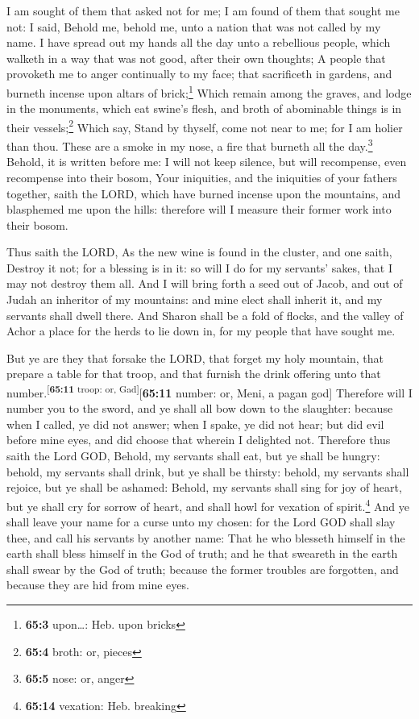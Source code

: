  I am sought of them that asked not for me; I am found of
them that sought me not: I said, Behold me, behold me, unto a nation
that was not called by my name.  I have spread out my
hands all the day unto a rebellious people, which walketh in a way that
was not good, after their own thoughts;  A people that
provoketh me to anger continually to my face; that sacrificeth in
gardens, and burneth incense upon altars of brick;\footnote{\textbf{65:3}
  upon\ldots: Heb. upon bricks}  Which remain among the
graves, and lodge in the monuments, which eat swine's flesh, and broth
of abominable things is in their vessels;\footnote{\textbf{65:4} broth:
  or, pieces}  Which say, Stand by thyself, come not near
to me; for I am holier than thou. These are a smoke in my nose, a fire
that burneth all the day.\footnote{\textbf{65:5} nose: or, anger}
 Behold, it is written before me: I will not keep silence,
but will recompense, even recompense into their bosom, 
Your iniquities, and the iniquities of your fathers together, saith the
LORD, which have burned incense upon the mountains, and blasphemed me
upon the hills: therefore will I measure their former work into their
bosom.

 Thus saith the LORD, As the new wine is found in the
cluster, and one saith, Destroy it not; for a blessing is in it: so will
I do for my servants' sakes, that I may not destroy them all.
 And I will bring forth a seed out of Jacob, and out of
Judah an inheritor of my mountains: and mine elect shall inherit it, and
my servants shall dwell there.  And Sharon shall be a
fold of flocks, and the valley of Achor a place for the herds to lie
down in, for my people that have sought me.

 But ye are they that forsake the LORD, that forget my
holy mountain, that prepare a table for that troop, and that furnish the
drink offering unto that number.\textsuperscript{{[}\textbf{65:11}
troop: or, Gad{]}}{[}\textbf{65:11} number: or, Meni, a pagan god{]}
 Therefore will I number you to the sword, and ye shall
all bow down to the slaughter: because when I called, ye did not answer;
when I spake, ye did not hear; but did evil before mine eyes, and did
choose that wherein I delighted not.  Therefore thus
saith the Lord GOD, Behold, my servants shall eat, but ye shall be
hungry: behold, my servants shall drink, but ye shall be thirsty:
behold, my servants shall rejoice, but ye shall be ashamed:
 Behold, my servants shall sing for joy of heart, but ye
shall cry for sorrow of heart, and shall howl for vexation of
spirit.\footnote{\textbf{65:14} vexation: Heb. breaking} 
And ye shall leave your name for a curse unto my chosen: for the Lord
GOD shall slay thee, and call his servants by another name:
 That he who blesseth himself in the earth shall bless
himself in the God of truth; and he that sweareth in the earth shall
swear by the God of truth; because the former troubles are forgotten,
and because they are hid from mine eyes.

